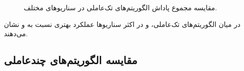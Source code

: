 \begin{figure}[H]

	\caption{مقایسه مجموع پاداش الگوریتم‌های تک‌عاملی در سناریوهای مختلف.}
	\label{fig:all_solo_robustness_violin}
\end{figure}

در میان الگوریتم‌های تک‌عاملی،  و  در اکثر سناریوها عملکرد بهتری نسبت به  و  نشان می‌دهند.

\subsection{مقایسه الگوریتم‌های چندعاملی}

